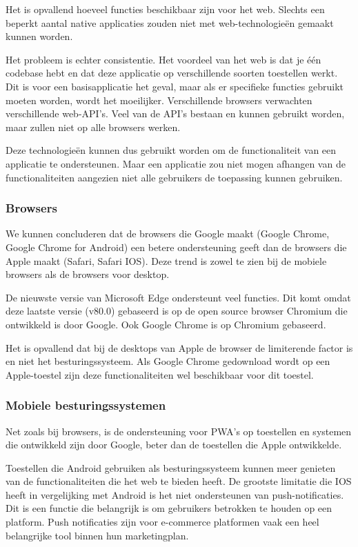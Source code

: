 	Het is opvallend hoeveel functies beschikbaar zijn voor het web. Slechts een beperkt aantal native applicaties zouden niet met web-technologieën gemaakt kunnen worden.
	
	Het probleem is echter consistentie. Het voordeel van het web is dat je één codebase hebt en dat deze applicatie op verschillende soorten toestellen werkt. Dit is voor een basisapplicatie het geval, maar als er specifieke functies gebruikt moeten worden, wordt het moeilijker. Verschillende browsers verwachten verschillende web-API’s. Veel van de API's bestaan en kunnen gebruikt worden, maar zullen niet op alle browsers werken.
	
	Deze technologieën kunnen dus gebruikt worden om de functionaliteit van een applicatie te ondersteunen. Maar een applicatie zou niet mogen afhangen van de functionaliteiten aangezien niet alle gebruikers de toepassing kunnen gebruiken.
	


\subsubsection{Browsers}

	We kunnen concluderen dat de browsers die Google maakt (Google Chrome, Google Chrome for Android) een betere ondersteuning geeft dan de browsers die Apple maakt (Safari, Safari IOS). Deze trend is zowel te zien bij de mobiele browsers als de browsers voor desktop.
	
	De nieuwste versie van Microsoft Edge ondersteunt veel functies. Dit komt omdat deze laatste versie (v80.0) gebaseerd is op de open source browser Chromium die ontwikkeld is door Google. Ook Google Chrome is op Chromium gebaseerd.
	
	Het is opvallend dat bij de desktops van Apple de browser de limiterende factor is en niet het besturingssysteem. Als Google Chrome gedownload wordt op een Apple-toestel zijn deze functionaliteiten wel beschikbaar voor dit toestel.
	
	

\subsubsection{Mobiele besturingssystemen }

	Net zoals bij browsers, is de ondersteuning voor PWA's op toestellen en systemen die ontwikkeld zijn door Google, beter dan de toestellen die Apple ontwikkelde.
	
	Toestellen die Android gebruiken als besturingssysteem kunnen meer genieten van de functionaliteiten die het web te bieden heeft.
	De grootste limitatie die IOS heeft in vergelijking met Android is het niet ondersteunen van push-notificaties. Dit is een functie die belangrijk is om gebruikers betrokken te houden op een platform. Push notificaties zijn voor e-commerce platformen vaak een heel belangrijke tool binnen hun marketingplan.
	\autocite{Anastasia2017}
	
